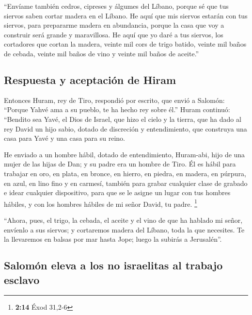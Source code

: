  ``Envíame también cedros, cipreses y álgumes del Líbano,
porque sé que tus siervos saben cortar madera en el Líbano. He aquí que
mis siervos estarán con tus siervos,  para prepararme
madera en abundancia, porque la casa que voy a construir será grande y
maravillosa.  He aquí que yo daré a tus siervos, los
cortadores que cortan la madera, veinte mil cors de trigo batido, veinte
mil baños de cebada, veinte mil baños de vino y veinte mil baños de
aceite.''

\hypertarget{respuesta-y-aceptaciuxf3n-de-hiram}{%
\subsection{Respuesta y aceptación de
Hiram}\label{respuesta-y-aceptaciuxf3n-de-hiram}}

 Entonces Huram, rey de Tiro, respondió por escrito, que
envió a Salomón: ``Porque Yahvé ama a su pueblo, te ha hecho rey sobre
él.''  Huram continuó: ``Bendito sea Yavé, el Dios de
Israel, que hizo el cielo y la tierra, que ha dado al rey David un hijo
sabio, dotado de discreción y entendimiento, que construya una casa para
Yavé y una casa para su reino.

 He enviado a un hombre hábil, dotado de entendimiento,
Huram-abi,  hijo de una mujer de las hijas de Dan; y su
padre era un hombre de Tiro. Él es hábil para trabajar en oro, en plata,
en bronce, en hierro, en piedra, en madera, en púrpura, en azul, en lino
fino y en carmesí, también para grabar cualquier clase de grabado e
idear cualquier dispositivo, para que se le asigne un lugar con tus
hombres hábiles, y con los hombres hábiles de mi señor David, tu padre.
\footnote{\textbf{2:14} Éxod 31,2-6}

 ``Ahora, pues, el trigo, la cebada, el aceite y el vino
de que ha hablado mi señor, envíenlo a sus siervos;  y
cortaremos madera del Líbano, toda la que necesites. Te la llevaremos en
balsas por mar hasta Jope; luego la subirás a Jerusalén''.

\hypertarget{salomuxf3n-eleva-a-los-no-israelitas-al-trabajo-esclavo}{%
\subsection{Salomón eleva a los no israelitas al trabajo
esclavo}\label{salomuxf3n-eleva-a-los-no-israelitas-al-trabajo-esclavo}}

